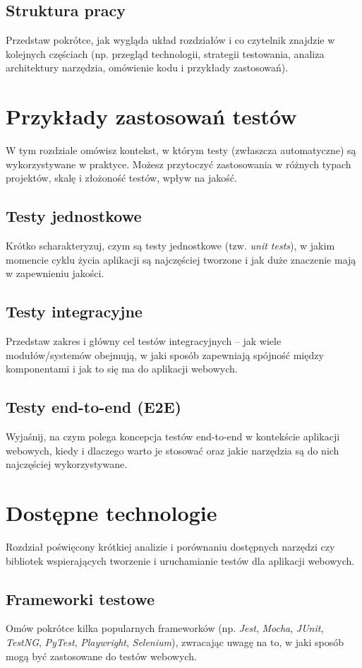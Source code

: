 \documentclass[12pt]{report}
\begin{document}
\section{Struktura pracy}
{Przedstaw pokrótce, jak wygląda układ rozdziałów i co czytelnik znajdzie w kolejnych częściach (np. przegląd technologii, strategii testowania, analiza architektury narzędzia, omówienie kodu i przykłady zastosowań).}


\chapter{Przykłady zastosowań testów}
{W tym rozdziale omówisz kontekst, w którym testy (zwłaszcza automatyczne) są wykorzystywane w praktyce. Możesz przytoczyć zastosowania w różnych typach projektów, skalę i złożoność testów, wpływ na jakość.}

\section{Testy jednostkowe}
{Krótko scharakteryzuj, czym są testy jednostkowe (tzw. \emph{unit tests}), w jakim momencie cyklu życia aplikacji są najczęściej tworzone i jak duże znaczenie mają w zapewnieniu jakości.}

\section{Testy integracyjne}
{Przedstaw zakres i główny cel testów integracyjnych – jak wiele modułów/systemów obejmują, w jaki sposób zapewniają spójność między komponentami i jak to się ma do aplikacji webowych.}

\section{Testy end-to-end (E2E)}
{Wyjaśnij, na czym polega koncepcja testów end-to-end w kontekście aplikacji webowych, kiedy i dlaczego warto je stosować oraz jakie narzędzia są do nich najczęściej wykorzystywane.}


\chapter{Dostępne technologie}
{Rozdział poświęcony krótkiej analizie i porównaniu dostępnych narzędzi czy bibliotek wspierających tworzenie i uruchamianie testów dla aplikacji webowych.}

\section{Frameworki testowe}
{Omów pokrótce kilka popularnych frameworków (np. \emph{Jest}, \emph{Mocha}, \emph{JUnit}, \emph{TestNG}, \emph{PyTest}, \emph{Playwright}, \emph{Selenium}), zwracając uwagę na to, w jaki sposób mogą być zastosowane do testów webowych.}
\end{document}
